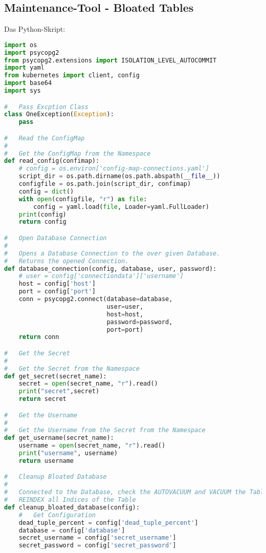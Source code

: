 
\begin{flushleft}
    \subsection{Maintenance-Tool - Bloated Tables}
    \label{subsec:maintenance_bloated_tables}
    Das Python-Skript:
    \lstset{style=gra_codestyle}
    \begin{lstlisting}[language=python, caption=Maintenance-Tool - Bloated Tables / Indices - ksgr\_postgresql\_maintenance\_bloated\_tables.py,captionpos=b,label={lst:maintenannce-tool-bloated-tables-python},breaklines=true]
import os
import psycopg2
from psycopg2.extensions import ISOLATION_LEVEL_AUTOCOMMIT
import yaml
from kubernetes import client, config
import base64
import sys

#   Pass Excption Class
class OneException(Exception):
    pass

#   Read the ConfigMap
#
#   Get the ConfigMap from the Namespace
def read_config(confimap):
    # config = os.environ['config-map-connections.yaml']
    script_dir = os.path.dirname(os.path.abspath(__file__))
    configfile = os.path.join(script_dir, confimap)
    config = dict()
    with open(configfile, "r") as file:
        config = yaml.load(file, Loader=yaml.FullLoader)
    print(config)
    return config

#   Open Database Connection
#
#   Opens a Database Connection to the over given Database.
#   Returns the opened Connection.
def database_connection(config, database, user, password):
    # user = config['connectiondata']['username']
    host = config['host']
    port = config['port']
    conn = psycopg2.connect(database=database,
                            user=user,
                            host=host,
                            password=password,
                            port=port)
    return conn

#   Get the Secret
#
#   Get the Secret from the Namespace
def get_secret(secret_name):
    secret = open(secret_name, "r").read()
    print("secret",secret)
    return secret

#   Get the Username
#
#   Get the Username from the Secret from the Namespace
def get_username(secret_name):
    username = open(secret_name, "r").read()
    print("username", username)
    return username

#   Cleanup Bloated Database
#
#   Connected to the Database, check the AUTOVACUUM and VACUUM the Table and
#   REINDEX all Indices of the Table
def cleanup_bloated_database(config):
    #   Get Configuration
    dead_tuple_percent = config['dead_tuple_percent']
    database = config['database']
    secret_username = config['secret_username']
    secret_password = config['secret_password']


\end{lstlisting}
\end{flushleft}
